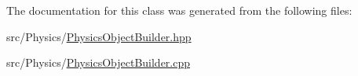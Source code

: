 The documentation for this class was generated from the following files\+:\begin{DoxyCompactItemize}
\item 
src/\+Physics/\hyperlink{PhysicsObjectBuilder_8hpp}{Physics\+Object\+Builder.\+hpp}\item 
src/\+Physics/\hyperlink{PhysicsObjectBuilder_8cpp}{Physics\+Object\+Builder.\+cpp}\end{DoxyCompactItemize}
